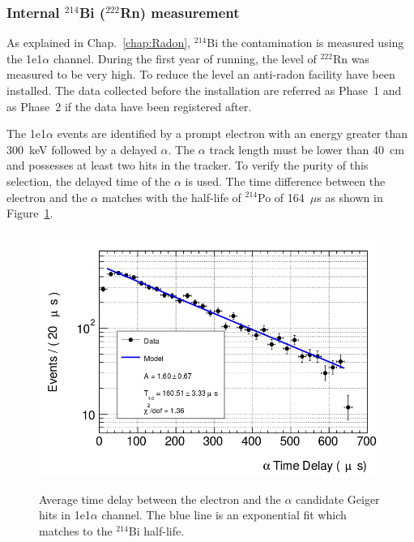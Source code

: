 \documentclass[main.tex]{subfiles}
\begin{document}
\FloatBarrier


\subsubsection{Internal $^{\text{214}}$Bi ($^{\text{222}}$Rn) measurement} \label{sec:1e1aChannel}


\NI As explained in Chap.~\ref{chap:Radon}, $^{\text{214}}$Bi the contamination is measured using the 1e1$\alpha$ channel. During the first year of running, the level of $^{\text{222}}$Rn was measured to be very high. To reduce the level an anti-radon facility have been installed. The data collected before the installation are referred as Phase~1 and as Phase~2 if the data have been registered after.


\bigskip


\NI The 1e1$\alpha$ events are identified by a prompt electron with an energy greater than 300~keV followed by a delayed $\alpha$. The $\alpha$ track length must be lower than 40~cm and possesses at least two hits in the tracker. To verify the purity of this selection, the delayed time of the $\alpha$ is used. The time difference between the electron and the $\alpha$ matches with the half-life of $^{\text{214}}$Po of 164~$\mu$s as shown in Figure~\ref{1e1aChannel_alphaDelayTime}.


\begin{figure}[h!]
\centering
\includegraphics[scale=0.4]{pictures/Chap6/alphaTimeDelay1e1aChannel.png}
\label{1e1aChannel_alphaDelayTime}
\caption{Average time delay between the electron and the $\alpha$ candidate Geiger hits in 1e1$\alpha$ channel. The blue line is an exponential fit which matches to the $^{\text{214}}$Bi half-life.}
\end{figure}
\end{document}
